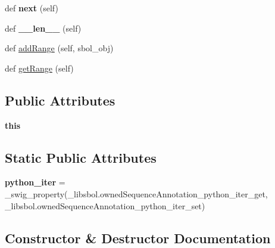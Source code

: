 \begin{DoxyCompactItemize}
\item 
def {\bfseries next} (self)\hypertarget{classsbol_1_1libsbol_1_1owned_sequence_annotation_a6f598e2b4013d92fe7a70135e5219d20}{}\label{classsbol_1_1libsbol_1_1owned_sequence_annotation_a6f598e2b4013d92fe7a70135e5219d20}

\item 
def {\bfseries \+\_\+\+\_\+len\+\_\+\+\_\+} (self)\hypertarget{classsbol_1_1libsbol_1_1owned_sequence_annotation_aa2532800cbd0450b9891336ad6c779e7}{}\label{classsbol_1_1libsbol_1_1owned_sequence_annotation_aa2532800cbd0450b9891336ad6c779e7}

\item 
def \hyperlink{classsbol_1_1libsbol_1_1owned_sequence_annotation_a1827114e5fecc882a6d64eb88d6696d2}{add\+Range} (self, sbol\+\_\+obj)
\item 
def \hyperlink{classsbol_1_1libsbol_1_1owned_sequence_annotation_a923a674fb3412ca07fdc5862f378b2ca}{get\+Range} (self)
\end{DoxyCompactItemize}
\subsection*{Public Attributes}
\begin{DoxyCompactItemize}
\item 
{\bfseries this}\hypertarget{classsbol_1_1libsbol_1_1owned_sequence_annotation_a100e98c00ce14984ff4e1eb5af947d5a}{}\label{classsbol_1_1libsbol_1_1owned_sequence_annotation_a100e98c00ce14984ff4e1eb5af947d5a}

\end{DoxyCompactItemize}
\subsection*{Static Public Attributes}
\begin{DoxyCompactItemize}
\item 
{\bfseries python\+\_\+iter} = \+\_\+swig\+\_\+property(\+\_\+libsbol.\+owned\+Sequence\+Annotation\+\_\+python\+\_\+iter\+\_\+get, \+\_\+libsbol.\+owned\+Sequence\+Annotation\+\_\+python\+\_\+iter\+\_\+set)\hypertarget{classsbol_1_1libsbol_1_1owned_sequence_annotation_a1fb0e40f2ed34db21f5a0736c9d49991}{}\label{classsbol_1_1libsbol_1_1owned_sequence_annotation_a1fb0e40f2ed34db21f5a0736c9d49991}

\end{DoxyCompactItemize}


\subsection{Constructor \& Destructor Documentation}
